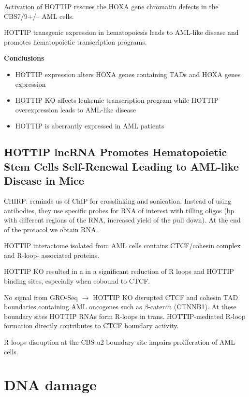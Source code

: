 Activation of HOTTIP rescues the HOXA gene chromatin defects in the CBS7/9+/-- AML cells.

HOTTIP transgenic expression in hematopoiesis leads to AML-like disease and promotes hematopoietic transcription programs.

\textbf{Conclusions}
\begin{itemize}
\tightlist
\item
  HOTTIP expression alters HOXA genes containing TADs and HOXA genes expression
\item
  HOTTIP KO affects leukemic transcription program while HOTTIP overexpression leads to AML-like disease
\item
  HOTTIP is aberrantly expressed in AML patients
\end{itemize}

\hypertarget{hottip-lncrna-promotes-hematopoietic-stem-cells-self-renewal-leading-to-aml-like-disease-in-mice}{%
\subsection{HOTTIP lncRNA Promotes Hematopoietic Stem Cells Self-Renewal Leading to AML-like Disease in Mice}\label{hottip-lncrna-promotes-hematopoietic-stem-cells-self-renewal-leading-to-aml-like-disease-in-mice}}

CHIRP: reminds us of ChIP for crosslinking and sonication. Instead of using antibodies, they use specific probes for RNA of interest with tilling oligos (bp with different regions of the RNA, increased yield of the pull down). At the end of the protocol we obtain RNA.

HOTTIP interactome isolated from AML cells contains CTCF/cohesin complex and R-loop- associated proteins.

HOTTIP KO resulted in a in a significant reduction of R loops and HOTTIP binding sites, especially when cobound to CTCF.

No signal from GRO-Seq $\rightarrow$ HOTTIP KO disrupted CTCF and cohesin TAD boundaries containing AML oncogenes such as $\beta$-catenin (CTNNB1). At these boundary sites HOTTIP RNAs form R-loops in trans. HOTTIP-mediated R-loop formation directly contributes to CTCF boundary activity.

R-loops disruption at the CBS-u2 boundary site impairs proliferation of AML cells.

\hypertarget{dna-damage}{%
\section{DNA damage}\label{dna-damage}}

